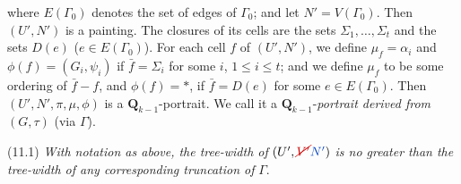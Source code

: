 where $E(\Gamma_0)$ denotes the set of edges of $\Gamma_0$; and let $N' = V(\Gamma_0)$. Then $(U', N')$ is a painting. The closures of its cells are the sets $\Sigma_1, \dots, \Sigma_t$ and the sets $D(e)$ ($e \in E(\Gamma_0)$). For each cell $f$ of $(U', N')$, we define $\mu_f = \alpha_i$ and $\phi(f) = (G_i, \psi_i)$ if $\bar{f} = \Sigma_i$ for some $i$, $1 \le i \le t$; and we define $\mu_f$ to be some ordering of $\bar{f} - f$, and $\phi(f) = *$, if $\bar{f} = D(e)$ for some $e \in E(\Gamma_0)$. Then $(U', N', \pi, \mu, \phi)$ is a $\mathbf{Q}_{k - 1}$-portrait. We call it a $\mathbf{Q}_{k - 1}$-\textit{portrait derived from} $(G, \tau)$ (via $\Gamma$).

\stmt
(11.1) \textit{With notation as above, the tree-width of} $(U', \delm{V'}\fix{N'})$ \textit{is no greater than the tree-width of any corresponding truncation of} $\Gamma$.
